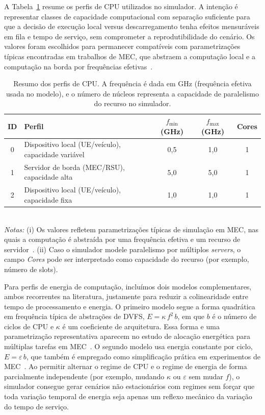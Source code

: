 A Tabela~\ref{tab:cpu-profiles-summary} resume os perfis de \gls{CPU} utilizados no simulador. A intenção é representar classes de capacidade computacional com separação suficiente para que a decisão de execução local versus descarregamento tenha efeitos mensuráveis em fila e tempo de serviço, sem comprometer a reprodutibilidade do cenário. Os valores foram escolhidos para permanecer compatíveis com parametrizações típicas encontradas em trabalhos de \gls{MEC}, que abstraem a computação local e a computação na borda por frequências efetivas~\cite{fang2021mec_iot,yang2019noma_mec}.

\begin{table}[htbp]
\centering
\caption{Resumo dos perfis de CPU. A frequência é dada em GHz (frequência efetiva usada no modelo), e o número de núcleos representa a capacidade de paralelismo do recurso no simulador.}
\label{tab:cpu-profiles-summary}
\footnotesize
\setlength{\tabcolsep}{6pt}
\begin{tabular}{c|p{4.4cm}|c|c|c}
\hline
\textbf{ID} & \textbf{Perfil} & \textbf{$f_{\min}$ (GHz)} & \textbf{$f_{\max}$ (GHz)} & \textbf{Cores} \\
\hline
0 & Dispositivo local (UE/veículo), capacidade variável & 0{,}5 & 1{,}0 & 1 \\
\hline
1 & Servidor de borda (\gls{MEC}/\gls{RSU}), capacidade alta & 5{,}0 & 5{,}0 & 1 \\
\hline
2 & Dispositivo local (UE/veículo), capacidade fixa & 1{,}0 & 1{,}0 & 1 \\
\hline
\end{tabular}
\vspace{2pt}
\\
{\footnotesize \textit{Notas:} (i) Os valores refletem parametrizações típicas de simulação em \gls{MEC}, nas quais a computação é abstraída por uma frequência efetiva e um recurso de servidor~\cite{fang2021mec_iot,yang2019noma_mec}. (ii) Caso o simulador modele paralelismo por múltiplos \textit{servers}, o campo \textit{Cores} pode ser interpretado como capacidade do recurso (por exemplo, número de slots).}
\end{table}

Para perfis de energia de computação, incluímos dois modelos complementares, ambos recorrentes na literatura, justamente para reduzir a colinearidade entre tempo de processamento e energia. O primeiro modelo segue a forma quadrática em frequência típica de abstrações de \gls{DVFS}, $E = \kappa \, f^2 \, b$, em que $b$ é o número de ciclos de \gls{CPU} e $\kappa$ é um coeficiente de arquitetura. Essa forma e uma parametrização representativa aparecem no estudo de alocação energética para múltiplas tarefas em \gls{MEC}~\cite{liu2022multitask_mec}. O segundo modelo usa energia constante por ciclo, $E = \varepsilon \, b$, que também é empregado como simplificação prática em experimentos de \gls{MEC}~\cite{yang2019noma_mec}. Ao permitir alternar o regime de \gls{CPU} e o regime de energia de forma parcialmente independente (por exemplo, mudando $\kappa$ ou $\varepsilon$ sem mudar $f$), o simulador consegue gerar cenários não estacionários com regimes sem forçar que toda variação temporal de energia seja apenas um reflexo mecânico da variação do tempo de serviço.

